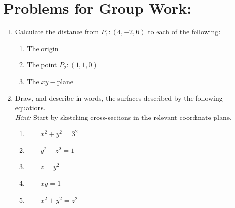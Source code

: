 


\section*{Problems for Group Work:}

\begin{enumerate}[{Problem }1]

\item Calculate the distance from \(P_1: (4, -2, 6)\) to each of the following:
\begin{enumerate}
\item The origin
\item The point \(P_2: (1,1,0)\)
\item The \(xy-\)plane
\end{enumerate}

\vfill

\item Draw, and describe in words,  the surfaces described by the following equations.\\
\textit{Hint:}  Start by sketching cross-sections in the relevant coordinate plane.\\



\begin{enumerate}


\item \(\qquad x^2+y^2 = 3^2\)

\item \(\qquad y^2+z^2 = 1\)

\item \(\qquad z=y^2\)

\item \(\qquad xy=1\)

\item \(\qquad x^2+y^2 =z^2\)


\end{enumerate}

\vfill
\end{enumerate}

\pagebreak


